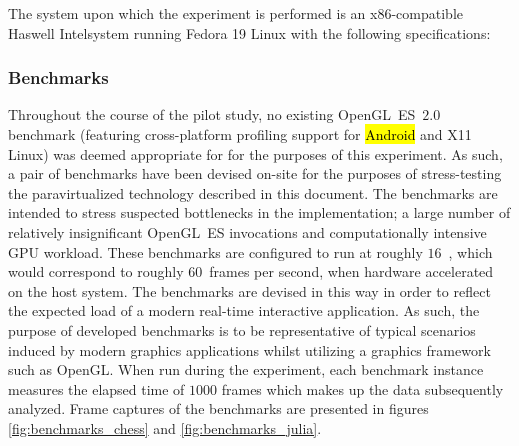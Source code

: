 The system upon which the experiment is performed is an x86-compatible Haswell Intel\circledR system running Fedora 19 Linux with the following specifications:


\subsubsection{Benchmarks}
\label{sec:experimentalmethodology_benchmarks}
Throughout the course of the pilot study, no existing OpenGL~ES~$2.0$ benchmark (featuring cross-platform profiling support for \hl{Android} and X11 Linux) was deemed appropriate for for the purposes of this experiment.
As such, a pair of benchmarks have been devised on-site for the purposes of stress-testing the paravirtualized technology described in this document.
The benchmarks are intended to stress suspected bottlenecks in the implementation; a large number of relatively insignificant OpenGL~ES invocations and computationally intensive GPU workload.
These benchmarks are configured to run at roughly $16$~\milli\second , which would correspond to roughly $60$~frames per second, when hardware accelerated on the host system.
The benchmarks are devised in this way in order to reflect the expected load of a modern real-time interactive application.
As such, the purpose of developed benchmarks is to be representative of typical scenarios induced by modern graphics applications whilst utilizing a graphics framework such as OpenGL.
When run during the experiment, each benchmark instance measures the elapsed time of $1000$ frames which makes up the data subsequently analyzed.
Frame captures of the benchmarks are presented in figures \ref{fig:benchmarks_chess} and \ref{fig:benchmarks_julia}.

